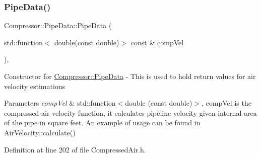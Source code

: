 \mbox{\label{struct_compressor_1_1_pipe_data_af7998fd533340b0a84e78fcda91b4806}} 
\subsubsection{\texorpdfstring{Pipe\+Data()}{PipeData()}\hspace{0.1cm}{\footnotesize\ttfamily [4/6]}}
{\footnotesize\ttfamily Compressor\+::\+Pipe\+Data\+::\+Pipe\+Data (\begin{DoxyParamCaption}\item[{std\+::function$<$ double(const double)$>$ const \&}]{comp\+Vel }\end{DoxyParamCaption})\hspace{0.3cm}{\ttfamily [inline]}, {\ttfamily [explicit]}}

Constructor for \hyperlink{struct_compressor_1_1_pipe_data}{Compressor\+::\+Pipe\+Data} -\/ This is used to hold return values for air velocity estimations 
\begin{DoxyParams}{Parameters}
{\em comp\+Vel} & std\+::function$<$double (const double)$>$, comp\+Vel is the compressed air velocity function, it calculates pipeline velocity given internal area of the pipe in square feet. An example of usage can be found in Air\+Velocity\+::calculate() \\
\hline
\end{DoxyParams}


Definition at line 202 of file Compressed\+Air.\+h.

\mbox{\label{struct_compressor_1_1_pipe_data_a2eb8afee8f68dd54dd1bf4d89b3188d9}} 

